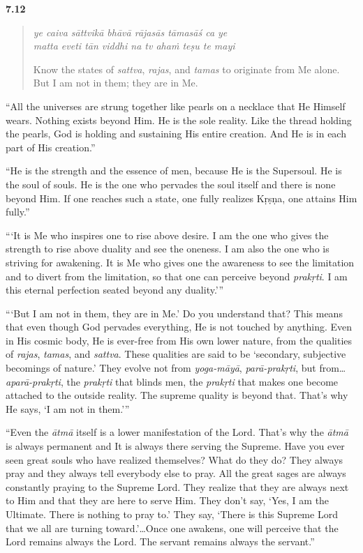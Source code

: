 \par\noindent\textbf{7.12}\par
\begin{verse}
\textit{ye caiva sāttvikā bhāvā rājasās tāmasāś ca ye} \\
\textit{matta eveti tān viddhi na tv ahaṁ teṣu te mayi}

\noindent Know the states of \textit{sattva}, \textit{rajas}, and \textit{tamas} to originate from Me alone. But I am not in them; they are in Me.
\end{verse}
\par


\enquote{All the universes are strung together like pearls on a necklace that He Himself wears. Nothing exists beyond Him. He is the sole reality. Like the thread holding the pearls, God is holding and sustaining His entire creation. And He is in each part of His creation.}

\enquote{He is the strength and the essence of men, because He is the Supersoul. He is the soul of souls. He is the one who pervades the soul itself and there is none beyond Him. If one reaches such a state, one fully realizes Kṛṣṇa, one attains Him fully.}

\enquote{\enquote{It is Me who inspires one to rise above desire. I am the one who gives the strength to rise above duality and see the oneness. I am also the one who is striving for awakening. It is Me who gives one the awareness to see the limitation and to divert from the limitation, so that one can perceive beyond \textit{prakṛti}. I am this eternal perfection seated beyond any duality.}}

\enquote{\enquote{But I am not in them, they are in Me.} Do you understand that? This means that even though God pervades everything, He is not touched by anything. Even in His cosmic body, He is ever-free from His own lower nature, from the qualities of \textit{rajas}, \textit{tamas}, and \textit{sattva}. These qualities are said to be \enquote{secondary, subjective becomings of nature.} They evolve not from \textit{yoga-māyā}, \textit{parā-prakṛti}, but from\ldots \textit{aparā-prakṛti}, the \textit{prakṛti} that blinds men, the \textit{prakṛti} that makes one become attached to the outside reality. The supreme quality is beyond that. That’s why He says, \enquote{I am not in them.}}

\enquote{Even the \textit{ātmā} itself is a lower manifestation of the Lord. That’s why the \textit{ātmā} is always permanent and It is always there serving the Supreme. Have you ever seen great souls who have realized themselves? What do they do? They always pray and they always tell everybody else to pray. All the great sages are always constantly praying to the Supreme Lord. They realize that they are always next to Him and that they are here to serve Him. They don’t say, \enquote{Yes, I am the Ultimate. There is nothing to pray to.} They say, \enquote{There is this Supreme Lord that we all are turning toward.}\ldots Once one awakens, one will perceive that the Lord remains always the Lord. The servant remains always the servant.}

